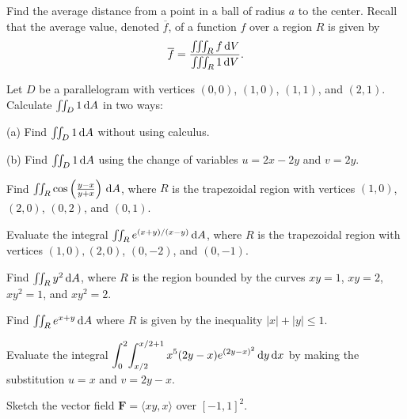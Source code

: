 \documentclass[svgnames]{watsonbook}
\begin{document}
\begin{aexercise}
  Find the average distance from a point in a ball of radius $a$ to
  the center. Recall that the average value, denoted $\overline{f}$,
  of a function $f$ over a region $R$ is given by
  \[
    \overline{f} = \frac{\iiint_R f \, {\mathrm{d}}V}{\iiint_R 1 \, {\mathrm{d}}V}.
  \]
\end{aexercise}



\begin{aexercise}
  Let $D$ be a parallelogram with vertices $(0,0)$, $(1,0)$, $(1,1)$,
  and $(2,1)$. Calculate $\iint_D 1\,\mathrm{d} A$ in two ways:

  (a) Find $\iint_D 1\,\mathrm{d} A$ without using calculus.

  (b) Find $\iint_D 1\,\mathrm{d} A$ using the change of variables $u = 2x - 2y$
  and $v=2y$.
\end{aexercise}

\begin{aexercise}
Find
$\iint_R \cos \left(\frac{y-x}{y+x}\right) \, {\mathrm{d}}A$, where $R$ is the
trapezoidal region with vertices $(1,0)$, $(2,0)$, $(0,2)$, and
$(0,1)$.
\end{aexercise}

\begin{aexercise}
  Evaluate the integral $\iint_R e^{(x+y)/(x-y)} \, {\mathrm{d}}A$, where $R$ is
  the trapezoidal region with vertices $(1,0), (2,0)$, $(0,-2)$, and
  $(0,-1)$.
\end{aexercise}

\begin{aexercise}
  Find $\iint_R y^2 \, {\mathrm{d}}A$, where $R$ is the region bounded by the
  curves $xy = 1$, $xy = 2$, $xy^2 = 1$, and $xy^2 = 2$.
\end{aexercise}

\begin{aexercise}
  Find $\iint_R e^{x+y} \, {\mathrm{d}}A$ where $R$ is given by the inequality
  $|x| + |y| \leq 1$.
\end{aexercise}

\begin{aexercise}
  Evaluate the integral
  $\displaystyle{\int_{0}^{2}\!\int_{x/2}^{x/2+1} x^5 (2y -
    x)e^{(2y-x)^2} \,\mathrm{d}y\,\mathrm{d}x}$ by making the substitution $u = x$ and
  $v=2y-x$.
\end{aexercise}


\begin{aexercise}
  Sketch the vector field $\mathbf{F} =\langle xy, x\rangle$ over
  $[-1,1]^2$. 
\end{aexercise}
\end{document}
